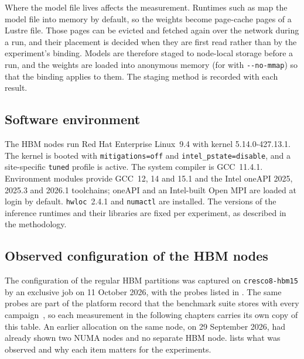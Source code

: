 Where the model file lives affects the measurement.  Runtimes such as
\lcpp{} map the model file into memory by default, so the weights become
page-cache pages of a Lustre file.  Those pages can be evicted and fetched
again over the network during a run, and their placement is decided when
they are first read rather than by the experiment's binding.  Models are
therefore staged to node-local storage before a run, and the weights are
loaded into anonymous memory (for \lcpp{} with \texttt{-{}-no-mmap}) so
that the binding applies to them.  The staging method is recorded with
each result.

\subsection{Software environment}
\label{sec:cresco8-software}

The HBM nodes run Red Hat Enterprise Linux~9.4 with kernel
5.14.0-427.13.1.  The kernel is booted with \texttt{mitigations=off} and
\texttt{intel\_pstate=disable}, and a site-specific \texttt{tuned}
profile is active.  The system compiler is GCC~11.4.1.  Environment
modules provide GCC~12, 14 and 15.1 and the Intel oneAPI 2025, 2025.3
and 2026.1 toolchains; oneAPI and an Intel-built Open MPI are loaded at
login by default.  \texttt{hwloc}~2.4.1 and \texttt{numactl} are
installed.  The versions of the inference runtimes and their libraries
are fixed per experiment, as described in the methodology.

\subsection{Observed configuration of the HBM nodes}
\label{sec:cresco8-observed}

The configuration of the regular HBM partitions was captured on
\texttt{cresco8-hbm15} by an exclusive job on 11 October 2026, with the
probes listed in .  The same probes are part
of the platform record that the benchmark suite stores with every
campaign~\cite{hwbench2026}, so each measurement in the following
chapters carries its own copy of this table.  An earlier allocation on
the same node, on 29 September 2026, had already shown two NUMA nodes and
no separate HBM node.   lists what was
observed and why each item matters for the experiments.


